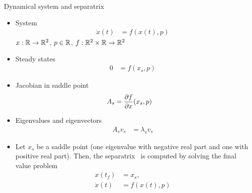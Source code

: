 \begin{frame}{Dynamical system and separatrix}
	\begin{itemize}
		\item System
		\begin{align}
			\dot x(t) &= f(x(t), p)
		\end{align}
		$x:\mathbb{R} \rightarrow \mathbb{R}^2$, $p \in \mathbb{R}$, $f: \mathbb{R}^2 \times \mathbb{R} \rightarrow \mathbb{R}^2$
		\item Steady states
		\begin{align}
			0 &= f(x_s, p)
		\end{align}
		\item Jacobian in saddle point
		\begin{align}
			A_s &= \frac{\partial{f}}{\partial{x}}(x_s, p)
		\end{align}
		\item Eigenvalues and eigenvectors
		\begin{align}
			A_s v_s &= \lambda_s v_s
		\end{align}
		\item Let $x_s$ be a saddle point (one eigenvalue with negative real part and one with positive real part). Then, the separatrix~\cite{Fay:Jourbert:2010} is computed by solving the final value problem
		\begin{subequations}\label{eq:fvp}
			\begin{align}
				x(t_f) &= x_s, \\
				\dot x(t) &= f(x(t), p)
			\end{align}
		\end{subequations}
	\end{itemize}
\end{frame}

